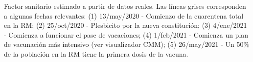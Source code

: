 \begin{images}[\label{alpha-comp}]{Factor sanitario estimado a partir de datos reales. Las líneas grises corresponden a algunas fechas relevantes: (1) 13/may/2020 - Comienzo de la cuarentena total en la RM; (2) 25/oct/2020 - Plesbicito por la nueva constitución; (3) 4/ene/2021 - Comienza a funcionar el pase de vacaciones; (4) 1/feb/2021 - Comienza un plan de vacunación más intensivo (ver visualizador CMM); (5) 26/may/2021 - Un 50\% de la población en la RM tiene la primera dosis de la vacuna.}
\end{images}

